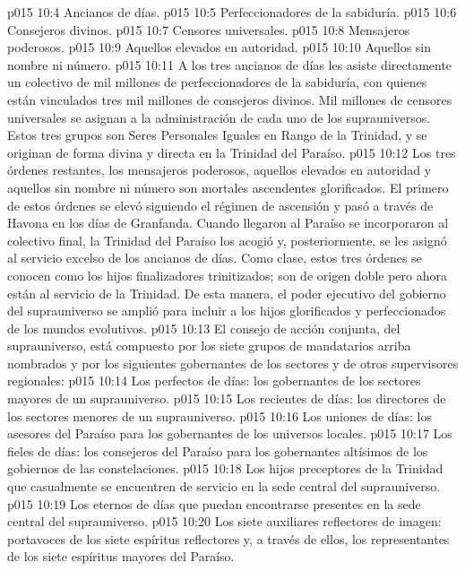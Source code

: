 \vs p015 10:4 Ancianos de días.
\vs p015 10:5 Perfeccionadores de la sabiduría.
\vs p015 10:6 Consejeros divinos.
\vs p015 10:7 Censores universales.
\vs p015 10:8 Mensajeros poderosos.
\vs p015 10:9 Aquellos elevados en autoridad.
\vs p015 10:10 Aquellos sin nombre ni número.
\vs p015 10:11 \pc A los tres ancianos de días les asiste directamente un colectivo de mil millones de perfeccionadores de la sabiduría, con quienes están vinculados tres mil millones de consejeros divinos. Mil millones de censores universales se asignan a la administración de cada uno de los suprauniversos. Estos tres grupos son Seres Personales Iguales en Rango de la Trinidad, y se originan de forma divina y directa en la Trinidad del Paraíso.
\vs p015 10:12 Los tres órdenes restantes, los mensajeros poderosos, aquellos elevados en autoridad y aquellos sin nombre ni número son mortales ascendentes glorificados. El primero de estos órdenes se elevó siguiendo el régimen de ascensión y pasó a través de Havona en los días de Granfanda. Cuando llegaron al Paraíso se incorporaron al colectivo final, la Trinidad del Paraíso los acogió y, posteriormente, se les asignó al servicio excelso de los ancianos de días. Como clase, estos tres órdenes se conocen como los hijos finalizadores trinitizados; son de origen doble pero ahora están al servicio de la Trinidad. De esta manera, el poder ejecutivo del gobierno del suprauniverso se amplió para incluir a los hijos glorificados y perfeccionados de los mundos evolutivos.
\vs p015 10:13 El consejo de acción conjunta, del suprauniverso, está compuesto por los siete grupos de mandatarios arriba nombrados y por los siguientes gobernantes de los sectores y de otros supervisores regionales:
\vs p015 10:14 Los perfectos de días: los gobernantes de los sectores mayores de un suprauniverso.
\vs p015 10:15 Los recientes de días: los directores de los sectores menores de un suprauniverso.
\vs p015 10:16 Los uniones de días: los asesores del Paraíso para los gobernantes de los universos locales.
\vs p015 10:17 Los fieles de días: los consejeros del Paraíso para los gobernantes altísimos de los gobiernos de las constelaciones.
\vs p015 10:18 Los hijos preceptores de la Trinidad que casualmente se encuentren de servicio en la sede central del suprauniverso.
\vs p015 10:19 Los eternos de días que puedan encontrarse presentes en la sede central del suprauniverso.
\vs p015 10:20 Los siete auxiliares reflectores de imagen: portavoces de los siete espíritus reflectores y, a través de ellos, los representantes de los siete espíritus mayores del Paraíso.
